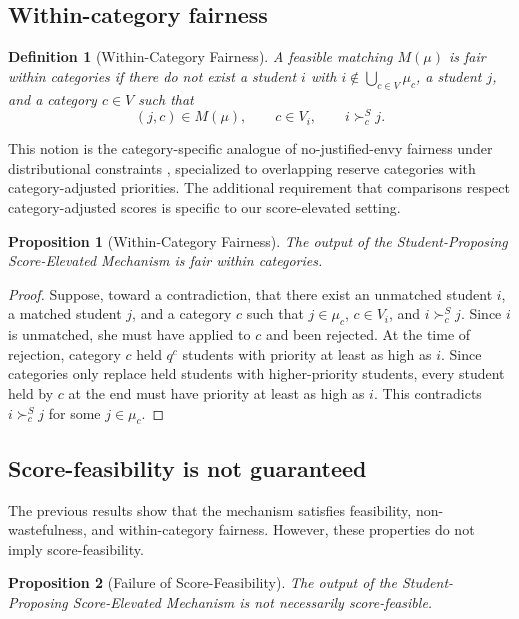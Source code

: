 \documentclass[10pt]{article}
\newtheorem{definition}{Definition}
\newtheorem{proposition}{Proposition}
\newcommand{\1}{\mathbf{1}}
\begin{document}
\subsection{Within-category fairness}

\begin{definition}[Within-Category Fairness]
A feasible matching $M(\mu)$ is fair within categories if there do not exist a student $i$ with $i\notin\bigcup_{c\in V}\mu_c$, a student $j$, and a category $c\in V$ such that
\[
(j,c)\in M(\mu),\qquad c\in V_i,\qquad i\succ_c^S j.
\]
\end{definition}

This notion is the category-specific analogue of no-justified-envy fairness under distributional constraints \citep{GKK+17a,KHIY17a}, specialized to overlapping reserve categories with category-adjusted priorities. The additional requirement that comparisons respect category-adjusted scores is specific to our score-elevated setting.

\begin{proposition}[Within-Category Fairness]
\label{prop:within-category-fairness}
The output of the Student-Proposing Score-Elevated Mechanism is fair within categories.
\end{proposition}

\begin{proof}
Suppose, toward a contradiction, that there exist an unmatched student $i$, a matched student $j$, and a category $c$ such that $j\in\mu_c$, $c\in V_i$, and $i\succ_c^S j$. Since $i$ is unmatched, she must have applied to $c$ and been rejected. At the time of rejection, category $c$ held $q^c$ students with priority at least as high as $i$. Since categories only replace held students with higher-priority students, every student held by $c$ at the end must have priority at least as high as $i$. This contradicts $i\succ_c^S j$ for some $j\in\mu_c$.
\end{proof}

\subsection{Score-feasibility is not guaranteed}

The previous results show that the mechanism satisfies feasibility, non-wastefulness, and within-category fairness. However, these properties do not imply score-feasibility.

\begin{proposition}[Failure of Score-Feasibility]
\label{prop:score-feasibility-not-guaranteed}
The output of the Student-Proposing Score-Elevated Mechanism is not necessarily score-feasible.
\end{proposition}
\end{document}
